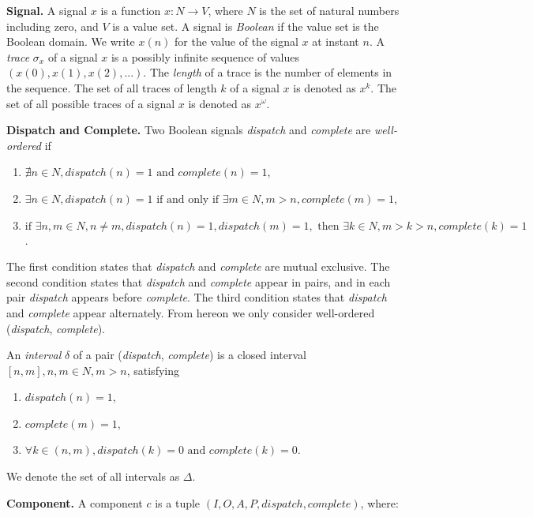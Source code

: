 {\bf Signal.}
A signal $x$ is a function $x: N \rightarrow V$, where $N$ is the set of natural numbers including zero, and $V$ is a value set. 
A signal is \emph{Boolean} if the value set is the Boolean domain.
We write $x(n)$ for the value of the signal $x$ at instant $n$. 
A \emph{trace} $\sigma_x$ of a signal $x$ is a possibly infinite sequence of values $(x(0), x(1), x(2),... )$. 
The \emph{length} of a trace is the number of elements in the sequence. 
The set of all traces of length $k$ of a signal $x$ is denoted as $x^k$. 
The set of all possible traces of a signal $x$ is denoted as $x^{\omega}$. 

{\bf Dispatch and Complete.}
Two Boolean signals \emph{dispatch} and \emph{complete} are \emph{well-ordered} if 

\begin{enumerate}
	\item $ \nexists n\in N, dispatch(n) = 1 \text{ and } complete(n) =  1 $, 
	\item $ \exists n\in N, dispatch(n) = 1 \text{ if and only if } \exists m\in N, m > n, complete(m) =  1 $,
	\item $ \text{if } \exists n,m\in N, n \neq m, dispatch(n) = 1, dispatch(m) = 1, \text{ then } \exists k\in N, m >k> n, complete(k) = 1 $.
\end{enumerate}

The first condition states that \emph{dispatch} and \emph{complete} are mutual exclusive. The second condition states that \emph{dispatch} and \emph{complete} appear in pairs, and in each pair \emph{dispatch} appears before \emph{complete}. The third condition states that \emph{dispatch} and \emph{complete} appear alternately. 
From hereon we only consider well-ordered (\emph{dispatch}, \emph{complete}).

An \emph{interval} $\delta$ of a pair (\emph{dispatch}, \emph{complete}) is a closed interval $[n, m], n,m \in N, m>n$, satisfying

\begin{enumerate}
	\item $ dispatch(n) = 1 $, 
	\item $ complete(m) = 1 $, 
	\item $ \forall k\in (n, m), dispatch(k)=0 \text{ and } complete(k)=0 $.
\end{enumerate}

We denote the set of all intervals as $\Delta$.

{\bf Component.}
A component $c$ is a tuple $(I, O, A, P, dispatch, complete)$, where: 

